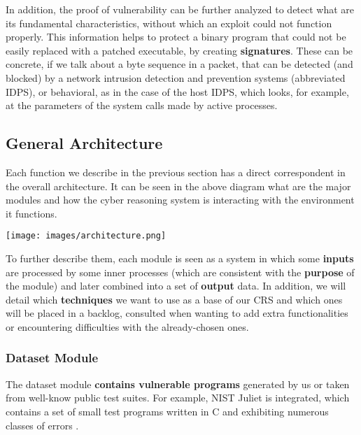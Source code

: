 \documentclass[12pt,a4paper,english,onecolumn]{IEEEtran}
\begin{document}
In addition, the proof of vulnerability can be further analyzed to detect what are its fundamental characteristics, without which an exploit could not function properly. This information helps to protect a binary program that could not be easily replaced with a patched executable, by creating \textbf{signatures}. These can be concrete, if we talk about a byte sequence in a packet, that can be detected (and blocked) by a network intrusion detection and prevention systems (abbreviated IDPS), or behavioral, as in the case of the host IDPS, which looks, for example, at the parameters of the system calls made by active processes.

\subsection{General Architecture}

Each function we describe in the previous section has a direct correspondent in the overall architecture. It can be seen in the above diagram what are the major modules and how the cyber reasoning system is interacting with the environment it functions.

\vspace{0.3cm}
\begin{center}
    \texttt{[image: images/architecture.png]}
    \label{fig:1}
    \captionsetup{justification=centering,margin=1cm}
\end{center}
\vspace{0.3cm}

To further describe them, each module is seen as a system in which some \textbf{inputs} are processed by some inner processes (which are consistent with the \textbf{purpose} of the module) and later combined into a set of \textbf{output} data. In addition, we will detail which \textbf{techniques} we want to use as a base of our CRS and which ones will be placed in a backlog, consulted when wanting to add extra functionalities or encountering difficulties with the already-chosen ones.

\subsubsection{Dataset Module}

The dataset module \textbf{contains vulnerable programs} generated by us or taken from well-know public test suites. For example, NIST Juliet is integrated, which contains a set of small test programs written in C and exhibiting numerous classes of errors \cite{juliet_testcase}.
\end{document}
